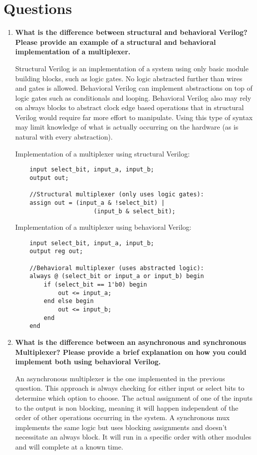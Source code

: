 \documentclass[11pt]{article}
\begin{document}
\section{Questions}
\begin{enumerate}
	\item \textbf{What is the difference between structural and behavioral Verilog? Please provide an example of a structural and behavioral implementation of a multiplexer.} 
	
	Structural Verilog is an implementation of a system using only basic module building blocks, such as logic gates. No logic abstracted further than wires and gates is allowed. Behavioral Verilog can implement abstractions on top of logic gates such as conditionals and looping. Behavioral Verilog also may rely on always blocks to abstract clock edge based operations that in structural Verilog would require far more effort to manipulate. Using this type of syntax may limit knowledge of what is actually occurring on the hardware (as is natural with every abstraction).
	
	Implementation of a multiplexer using structural Verilog:
	
	\begin{lstlisting}
	input select_bit, input_a, input_b;
	output out;
	
	//Structural multiplexer (only uses logic gates):
	assign out = (input_a & !select_bit) | 
	                  (input_b & select_bit);
	\end{lstlisting}
	
	Implementation of a multiplexer using behavioral Verilog:
	
	\begin{lstlisting}
	input select_bit, input_a, input_b;
	output reg out;
	
	//Behavioral multiplexer (uses abstracted logic):	
	always @ (select_bit or input_a or input_b)	begin
		if (select_bit == 1'b0) begin
			out <= input_a;
		end else begin
			out <= input_b;
		end
	end
	\end{lstlisting}
	
	\item \textbf{What is the difference between an asynchronous and synchronous Multiplexer? Please provide a brief explanation on how you could implement both using behavioral Verilog.}
	
	An asynchronous multiplexer is the one implemented in the previous question. This approach is always checking for either input or select bits to determine which option to choose. The actual assignment of one of the inputs to the output is non blocking, meaning it will happen independent of the order of other operations occurring in the system. A synchronous mux implements the same logic but uses blocking assignments and doesn't necessitate an always block. It will run in a specific order with other modules and will complete at a known time. 
	

\end{enumerate}
\end{document}
